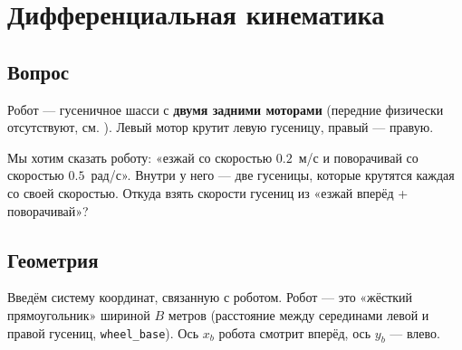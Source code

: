 \chapter{Дифференциальная кинематика}
\label{ch:kinematics}

\section{Вопрос}

Робот --- гусеничное шасси с \textbf{двумя задними моторами} (передние
физически отсутствуют, см. ).
Левый мотор крутит левую гусеницу, правый --- правую.

\begin{ideabox}
Мы хотим сказать роботу: «езжай со скоростью $0.2$~м/с и поворачивай
со скоростью $0.5$~рад/с». Внутри у него --- две гусеницы, которые
крутятся каждая со своей скоростью. Откуда взять скорости гусениц
из «езжай вперёд + поворачивай»?
\end{ideabox}

\section{Геометрия}

Введём систему координат, связанную с роботом. Робот ---  это «жёсткий
прямоугольник» шириной $B$ метров (расстояние между серединами левой и
правой гусениц, \texttt{wheel\_base}). Ось $x_b$ робота смотрит вперёд,
ось $y_b$ --- влево.

\begin{center}
\end{center}

